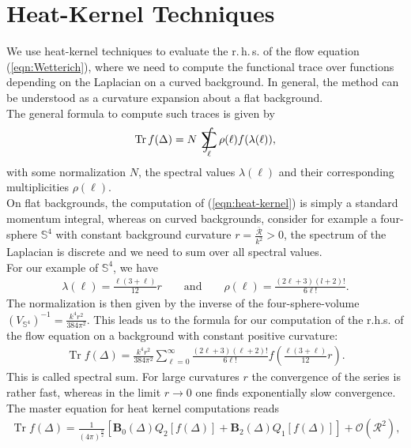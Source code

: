 \section{Heat-Kernel Techniques}\label{sec:heat-kernel}
We use heat-kernel techniques to evaluate the r.\,h.\,s. of the flow equation (\ref{eqn:Wetterich}), where we need to compute the functional trace over functions depending on the Laplacian on a curved background. In general, the method can be understood as a curvature expansion about a flat background. \\
The general formula to compute such traces is given by
\begin{align}
	\operatorname{Tr} f(\Delta)= N \  \int\kern-1.3em\sum_{\ell} \rho(\ell) f(\lambda(\ell)),
	\label{eqn:heat-kernel}
\end{align}
with some normalization $N$, the spectral values $\lambda(\ell)$ and their corresponding multiplicities $\rho(\ell)$. \\
On flat backgrounds, the computation of (\ref{eqn:heat-kernel}) is simply a standard momentum integral, whereas on curved backgrounds, consider for example a four-sphere $\mathbb{S}^4$ with constant background curvature $r = \frac{\bar{\mathcal{R}}}{k^2} > 0$, the spectrum of the Laplacian is discrete and we need to sum over all spectral values. \\
For our example of $\mathbb{S}^4$, we have
\begin{align}
	\lambda(\ell) = \frac{\ell(3+\ell)}{12}r \qquad \text{and} \qquad \rho(\ell) = \frac{(2\ell + 3)(l+2)!}{6\ell!}.
\end{align}
The normalization is then given by the inverse of the four-sphere-volume $ \left(V_{\mathbb{S}^4}\right)^{-1} = \frac{k^4r^2}{384\pi^2}$. This leads us to the formula for our computation of the r.h.s. of the flow equation on a background with constant positive curvature:
\begin{align}
\operatorname{Tr} f(\Delta)=\frac{k^{4} r^{2}}{384 \pi^{2}} \sum_{\ell=0}^{\infty} \frac{(2 \ell+3)(\ell+2) !}{6 \ell !} f\left(\frac{\ell(3+\ell)}{12} r\right).
\end{align}
This is called spectral sum. For large curvatures $r$ the convergence of the series is rather fast, whereas in the limit $r\rightarrow 0$ one finds exponentially slow convergence.\\
The master equation for heat kernel computations reads
\begin{align}
	\operatorname{Tr} f(\Delta)=\frac{1}{(4 \pi)^{\frac{d}{2}}}\left[\mathbf{B}_{0}(\Delta) Q_{2}[f(\Delta)]+\mathbf{B}_{2}(\Delta) Q_{1}[f(\Delta)]\right]+\mathcal{O}\left(\mathcal{R}^{2}\right),
\label{eqn:master-eqn}
\end{align}

